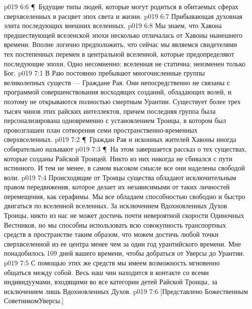 \vs p019 6:6 \P\ \bibnobreakspace Будущие типы людей, которые могут родиться в обитаемых сферах сверхвселенных в расцвет эпох света и жизни.
\vs p019 6:7 \bibnobreakspace Прибывающая духовная элита последующих внешних вселенных.
\vs p019 6:8 Мы знаем, что Хавона предшествующей вселенской эпохи несколько отличалась от Хавоны нынешнего времени. Вполне логично предположить, что сейчас мы являемся свидетелями тех постепенных перемен в центральной вселенной, которые предопределяют последующие эпохи. Одно несомненно: вселенная не статична; неизменен только Бог.
\vs p019 7:1 В Раю постоянно пребывают многочисленные группы великолепных существ --- Граждане Рая. Они непосредственно не связаны с программой совершенствования восходящих созданий, обладающих волей, и поэтому не открываются полностью смертным Урантии. Существует более трех тысяч чинов этих райских интеллектов, причем последняя группа была персонализирована одновременно с установлением Троицы, в котором был провозглашен план сотворения семи пространственно\hyp{}временных сверхвселенных.
\vs p019 7:2 \P\ Граждан Рая и исконных жителей Хавоны иногда собирательно называют 
\vs p019 7:3 \P\ На этом завершается рассказ о тех существах, которые созданы Райской Троицей. Никто из них никогда не сбивался с пути истинного. И тем не менее, в самом высоком смысле все они наделены свободой воли.
\vs p019 7:4 Происходящие от Троицы существа обладают исключительным правом передвижения, которое делает их независимыми от таких личностей перемещения, как серафимы. Мы все обладаем способностью свободно и быстро двигаться по вселенной вселенных. За исключением Вдохновленных Духов Троицы, никто из нас не может достичь почти невероятной скорости Одиночных Вестников, но мы способны использовать всю совокупность транспортных средств в пространстве таким образом, что можем достичь любой точки сверхвселенной из ее центра менее чем за один год урантийского времени. Мне понадобилось 109 дней вашего времени, чтобы добраться от Уверсы до Урантии.
\vs p019 7:5 С помощью этих же средств мы имеем возможность мгновенно общаться между собой. Весь наш чин находится в контакте со всеми индивидуумами, входящими во все категории детей Райской Троицы, за исключением лишь Вдохновленных Духов.
\vs p019 7:6 [Представлено Божественным СоветникомУверсы.]

